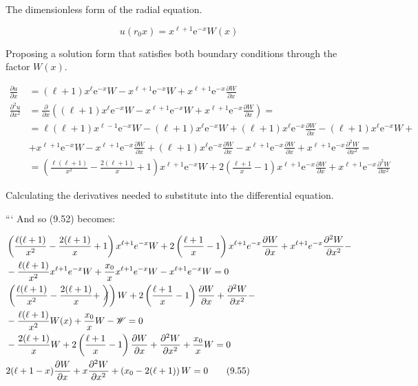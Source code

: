 \documentclass[italian]{HKNdocument}
\begin{document}
The dimensionless form of the radial equation.

\begin{equation*}
u\left(r_{0} x\right)=x^{\ell+1} \mathrm{e}^{-x} W(x) \tag{9.53}
\end{equation*}

Proposing a solution form that satisfies both boundary conditions through the factor $W(x)$.

\begin{align*}
\frac{\partial u}{\partial x} & =(\ell+1) x^{\ell} \mathrm{e}^{-x} W-x^{\ell+1} \mathrm{e}^{-x} W+x^{\ell+1} \mathrm{e}^{-x} \frac{\partial W}{\partial x} \\
\frac{\partial^{2} u}{\partial x^{2}} & =\frac{\partial}{\partial x}\left((\ell+1) x^{\ell} \mathrm{e}^{-x} W-x^{\ell+1} \mathrm{e}^{-x} W+x^{\ell+1} \mathrm{e}^{-x} \frac{\partial W}{\partial x}\right)= \\
& =\ell(\ell+1) x^{\ell-1} \mathrm{e}^{-x} W-(\ell+1) x^{\ell} \mathrm{e}^{-x} W+(\ell+1) x^{\ell} \mathrm{e}^{-x} \frac{\partial W}{\partial x}-(\ell+1) x^{\ell} \mathrm{e}^{-x} W+ \\
& +x^{\ell+1} \mathrm{e}^{-x} W-x^{\ell+1} \mathrm{e}^{-x} \frac{\partial W}{\partial x}+(\ell+1) x^{\ell} \mathrm{e}^{-x} \frac{\partial W}{\partial x}-x^{\ell+1} \mathrm{e}^{-x} \frac{\partial W}{\partial x}+x^{\ell+1} \mathrm{e}^{-x} \frac{\partial^{2} W}{\partial x^{2}}= \\
& =\left(\frac{\ell(\ell+1)}{x^{2}}-\frac{2(\ell+1)}{x}+1\right) x^{\ell+1} \mathrm{e}^{-x} W+2\left(\frac{\ell+1}{x}-1\right) x^{\ell+1} \mathrm{e}^{-x} \frac{\partial W}{\partial x}+x^{\ell+1} \mathrm{e}^{-x} \frac{\partial^{2} W}{\partial x^{2}} \tag{9.54}
\end{align*}

Calculating the derivatives needed to substitute into the differential equation.

```
And so (9.52) becomes:

\begin{align*}
& \left(\frac{\ell(\ell+1)}{x^{2}}-\frac{2(\ell+1)}{x}+1\right) x^{\ell+1} e^{-x} W+2\left(\frac{\ell+1}{x}-1\right) x^{\ell+1} e^{-x} \frac{\partial W}{\partial x}+x^{\ell+1} e^{-x} \frac{\partial^{2} W}{\partial x^{2}}- \\
& -\frac{\ell(\ell+1)}{x^{2}} x^{\ell+1} e^{-x} W+\frac{x_{0}}{x} x^{\ell+1} e^{-x} W-x^{\ell+1} e^{-x} W=0 \\
& \left.\left(\frac{\ell(\ell+1)}{x^{2}}-\frac{2(\ell+1)}{x}+\not\right)\right) W+2\left(\frac{\ell+1}{x}-1\right) \frac{\partial W}{\partial x}+\frac{\partial^{2} W}{\partial x^{2}}- \\
& -\frac{\ell(\ell+1)}{x^{2}} W(x)+\frac{x_{0}}{x} W-\mathscr{W}=0 \\
& -\frac{2(\ell+1)}{x} W+2\left(\frac{\ell+1}{x}-1\right) \frac{\partial W}{\partial x}+\frac{\partial^{2} W}{\partial x^{2}}+\frac{x_{0}}{x} W=0 \\
& 2(\ell+1-x) \frac{\partial W}{\partial x}+x \frac{\partial^{2} W}{\partial x^{2}}+\left(x_{0}-2(\ell+1)\right) W=0 \tag{9.55}
\end{align*}
\end{document}
